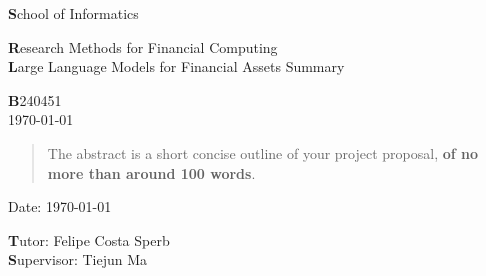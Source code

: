 \documentclass[a4paper,11pt]{article}
\newcommand{\examnumber}{B240451}
\newcommand{\field}{Large Language Models for Financial Assets Summary}
\newcommand{\tutor}{Felipe Costa Sperb}
\newcommand{\supervisor}{Tiejun Ma}
\begin{document}
\begin{minipage}[b]{110mm}
        {\Huge\textbf School of Informatics
        \vspace*{17mm}}
\end{minipage}
\hfill
\begin{minipage}[t]{40mm}               
\end{minipage}
\par\noindent
\vspace*{2cm}
\begin{center}
        \Large\textbf Research Methods for Financial Computing \\
        \Large\textbf \field
\end{center}
\vspace*{1.5cm}
\begin{center}
        \textbf \examnumber\\
        \monthyeardate\today
\end{center}
\vspace*{5mm}

%
%                       
\begin{abstract}
        The abstract is a short concise outline of your 
        project proposal, \textbf{of no more than around 100 words}.
\end{abstract}

\vspace*{1cm}

\vspace*{3cm}
Date: \today

\vfill
{\textbf Tutor:} \tutor\\
{\textbf Supervisor:} \supervisor
\newpage

\setcounter{page}{1}                            %
\footruleheight{1pt}
\headruleheight{1pt}
\rhead{- \thepage}
\cfoot{}
%
\end{document}
